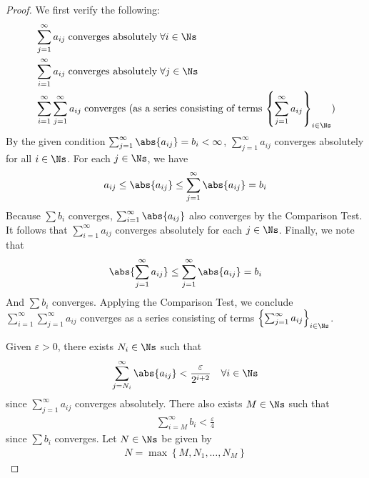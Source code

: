 \documentclass[thmcnt=section, 12pt]{elegantbook}
\begin{document}
\begin{proof}
    We first verify the following:
    \begin{align*}
        &\sum_{j=1}^\infty a_{ij} \; \text{converges absolutely} \; \forall i \in \Ns \\
        &\sum_{i=1}^\infty a_{ij} \; \text{converges absolutely} \; \forall j \in \Ns \\
        &\sum_{i=1}^\infty \sum_{j=1}^\infty a_{ij} \; \text{converges (as a series consisting of terms $\left\{\sum_{j=1}^\infty a_{ij}\right\}_{i \in \Ns}$)}
    \end{align*}
    By the given condition $\sum_{j=1}^\infty \abs{a_{ij}} = b_i < \infty$, $\sum_{j=1}^\infty a_{ij}$ converges absolutely for all $i \in \Ns$. 
    For each $j \in \Ns$, we have
    \begin{align*}
        a_{ij} \leq \abs{a_{ij}} 
        \leq \sum_{j=1}^\infty \abs{a_{ij}} 
        = b_i
    \end{align*}
    Because $\sum b_i$ converges, $\sum_{i=1}^\infty \abs{a_{ij}}$ also converges by the Comparison Test. It follows that $\sum_{i=1}^\infty a_{ij}$ converges absolutely for each $j \in \Ns$.
    Finally, we note that 
    \begin{align*}
        \abs{\sum_{j=1}^\infty a_{ij}}
        \leq \sum_{j=1}^\infty \abs{a_{ij}}
        = b_i
    \end{align*}
    And $\sum b_i$ converges. Applying the Comparison Test, we conclude $\sum_{i=1}^\infty \sum_{j=1}^\infty a_{ij}$ converges as a series consisting of terms $\left\{\sum_{j=1}^\infty a_{ij}\right\}_{i \in \Ns}$.

    \par Given $\varepsilon > 0$, there exists $N_i \in \Ns$ such that 
    \begin{align}
        \sum_{j=N_i}^\infty \abs{a_{ij}} < \frac{\varepsilon}{2^{i+2}} 
        \quad \forall i \in \Ns 
        \label{eq:20}
    \end{align}
    since $\sum_{j=1}^\infty a_{ij}$ converges absolutely.
    There also exists $M \in \Ns$ such that
    \begin{align}
        \sum_{i=M}^\infty b_i < \frac{\varepsilon}{4}
        \label{eq:21}
    \end{align}
    since $\sum b_i$ converges.
    Let $N \in \Ns$ be given by 
    \begin{align}
        N = \max \left\{M, N_1, \ldots, N_M\right\}
        \label{eq:22}
    \end{align}


\end{proof}
\end{document}
